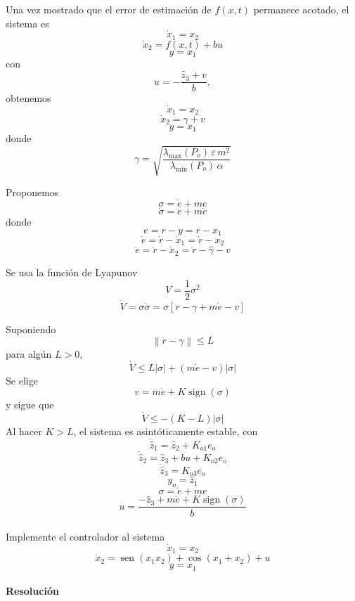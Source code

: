 \begin{flushright}
\end{flushright}

Una vez mostrado que el error de estimación de $f(x,t)$ permanece acotado, el
sistema es
\[
  \dot{x}_1=x_2
\]
\[
  \dot{x}_2=f(x,t)+bu
\]
\[
  y=x_1
\]
con
\[
  u=-\frac{\hat{z}_3+v}{b},
\]
obtenemos
\[
  \dot{x}_1=x_2
\]
\[
  \dot{x}_2=\gamma+v
\]
\[
  y=x_1
\]
donde
\[
  \gamma=
  \sqrt{\frac{\lambda_{\max}(P_o)\,\varepsilon\,m^2}
  {\lambda_{\min}(P_o)\,\alpha}}
\]

Proponemos
\[
  \sigma=\dot{e}+me
\]
\[
  \dot{\sigma}=\ddot{e}+m\dot{e}
\]
donde
\[
  e=r-y=r-x_1
\]
\[
  \dot{e}=\dot{r}-\dot{x}_1=\dot{r}-x_2
\]
\[
  \ddot{e}=\ddot{r}-\dot{x}_2=\ddot{r}-\hat{\gamma}-v
\]

Se usa la función de Lyapunov
\[
  V=\frac{1}{2}\sigma^2
\]
\[
  \dot{V}=\sigma\dot{\sigma}
  =\sigma\left[\ddot{r}-\gamma+m\dot{e}-v\right]
\]

Suponiendo
\[
  \left\lVert\ddot{r}-\gamma\right\rVert\leq L
\]
para algún $L>0$,
\[
  \dot{V}\leq L\lvert\sigma\rvert
  +(m\dot{e}-v)\lvert\sigma\rvert
\]
Se elige
\[
  v=m\dot{e}+K\operatorname{sign}(\sigma)
\]
y sigue que
\[
  \dot{V}\leq-(K-L)\lvert\sigma\rvert
\]
Al hacer $K>L$, el sistema es asintóticamente estable, con
\[
  \dot{\hat{z}}_1=\hat{z}_2+K_{o1}e_o
\]
\[
  \dot{\hat{z}}_2=\hat{z}_3+bu+K_{o2}e_o
\]
\[
  \dot{\hat{z}}_3=K_{o3}e_o
\]
\[
  y_o=\hat{z}_1
\]
\[
  \sigma=\dot{e}+me
\]
\[
  u=\frac{-\hat{z}_3+m\dot{e}+K\operatorname{sign}(\sigma)}{b}
\]

\paragraph{} Implemente el controlador al sistema
\[
  \dot{x}_1=x_2
\]
\[
  \dot{x}_2=
  \operatorname{sen}(x_1x_2)+\cos(x_1+x_2)+u
\]
\[
  y=x_1
\]

\paragraph{Resolución}
